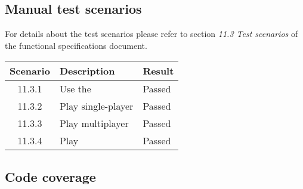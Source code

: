 \subsection{Manual test scenarios}

For details about the test scenarios please refer to section \emph{11.3 Test scenarios} of the functional specifications document.\par

\begin{tabular}{cll}

\hline
	\textbf{Scenario} & \textbf{Description} & \textbf{Result} \\
	\hline
	11.3.1 & Use the \gameexplorer & Passed \\
	11.3.2 & Play \graphcoloring single-player & Passed \\
	11.3.3 & Play \graphcoloring multiplayer & Passed \\
	11.3.4 & Play \twixt & Passed \\
	\hline
\end{tabular}

\subsection{Code coverage}